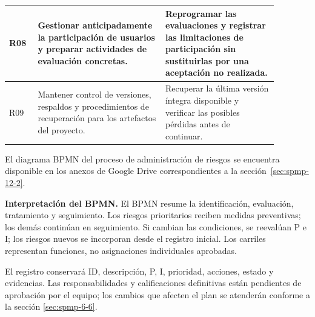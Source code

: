 \begin{longtable}{|p{0.09\linewidth}|p{0.42\linewidth}|p{0.37\linewidth}|}
R08 & Gestionar anticipadamente la participación de usuarios y preparar actividades de evaluación concretas. & Reprogramar las evaluaciones y registrar las limitaciones de participación sin sustituirlas por una aceptación no realizada.\\\hline
R09 & Mantener control de versiones, respaldos y procedimientos de recuperación para los artefactos del proyecto. & Recuperar la última versión íntegra disponible y verificar las posibles pérdidas antes de continuar.\\\hline
\end{longtable}

El diagrama BPMN del proceso de administración de riesgos se encuentra disponible en los anexos de Google Drive correspondientes a la sección~\ref{sec:spmp-12-2}.

\textbf{Interpretación del BPMN.} El BPMN resume la identificación, evaluación, tratamiento y seguimiento. Los riesgos prioritarios reciben medidas preventivas; los demás continúan en seguimiento. Si cambian las condiciones, se reevalúan P e I; los riesgos nuevos se incorporan desde el registro inicial. Los carriles representan funciones, no asignaciones individuales aprobadas.

El registro conservará ID, descripción, P, I, prioridad, acciones, estado y evidencias. Las responsabilidades y calificaciones definitivas están pendientes de aprobación por el equipo; los cambios que afecten el plan se atenderán conforme a la sección \ref{sec:spmp-6-6}.
